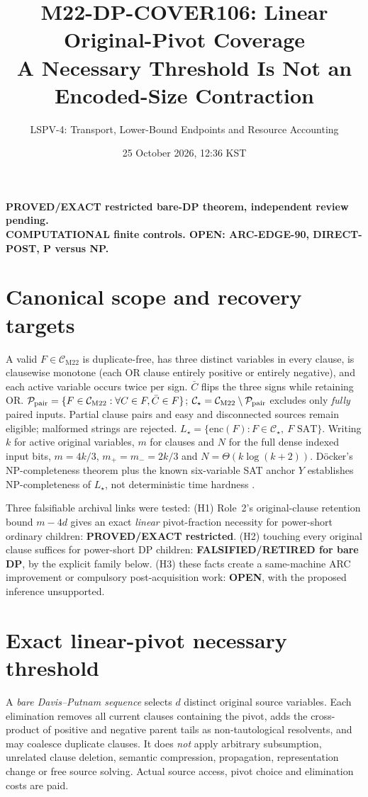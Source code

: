 \documentclass[11pt]{article}
\title{M22-DP-COVER106: Linear Original-Pivot Coverage\\
\large A Necessary Threshold Is Not an Encoded-Size Contraction}
\author{LSPV-4: Transport, Lower-Bound Endpoints and Resource Accounting}
\date{25 October 2026, 12:36 KST}
\newcommand{\CM}{\mathcal C_{\mathrm{M22}}}
\newcommand{\CS}{\mathcal C_\star}
\begin{document}
\maketitle
\begin{center}
\textbf{PROVED/EXACT restricted bare-DP theorem, independent review pending.}\\
\textbf{COMPUTATIONAL finite controls. OPEN: ARC-EDGE-90, DIRECT-POST, P versus NP.}
\end{center}
\section{Canonical scope and recovery targets}
A valid $F\in\CM$ is duplicate-free, has three distinct variables in every
clause, is clausewise monotone (each OR clause entirely positive or
entirely negative), and each active variable occurs twice per sign.
$\bar C$ flips the three signs while retaining OR.
$\mathcal P_{\rm pair}=\{F\in\CM:\forall C\in F,\bar C\in F\}$;
$\CS=\CM\setminus\mathcal P_{\rm pair}$ excludes only \emph{fully}
paired inputs. Partial clause pairs and easy and disconnected sources
remain eligible; malformed strings are rejected.
$L_\star=\{\mathrm{enc}(F):F\in\CS,\ F\text{ SAT}\}$.
Writing $k$ for active original variables, $m$ for clauses and $N$
for the full dense indexed input bits, $m=4k/3$, $m_+=m_-=2k/3$
and $N=\Theta(k\log(k+2))$. D\"ocker's NP-completeness theorem plus
the known six-variable SAT anchor $Y$ establishes NP-completeness of
$L_\star$, not deterministic time hardness \cite{docker}.

Three falsifiable archival links were tested: (H1) Role~2's
original-clause retention bound $m-4d$ gives an exact \emph{linear}
pivot-fraction necessity for power-short ordinary children:
\textbf{PROVED/EXACT restricted}.
(H2) touching every original clause suffices for power-short DP
children: \textbf{FALSIFIED/RETIRED for bare DP}, by the explicit
family below.
(H3) these facts create a same-machine ARC improvement or compulsory
post-acquisition work: \textbf{OPEN}, with the proposed inference
unsupported.

\section{Exact linear-pivot necessary threshold}
A \emph{bare Davis--Putnam sequence} selects $d$ distinct original
source variables. Each elimination removes all current clauses
containing the pivot, adds the cross-product of positive and
negative parent tails as non-tautological resolvents, and may
coalesce duplicate clauses. It does \emph{not} apply arbitrary
subsumption, unrelated clause deletion, semantic compression,
propagation, representation change or free source solving.
Actual source access, pivot choice and elimination costs are paid.
\end{document}
